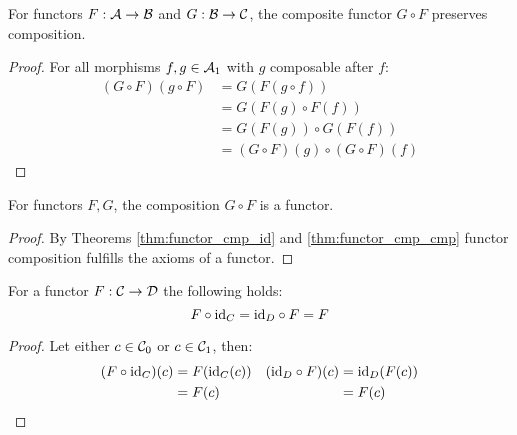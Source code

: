 \begin{theorem}
  For functors $F:\mathcal{A}\to \mathcal{B}$ and $G:\mathcal{B}\to \mathcal{C}$, the composite functor $G\circ F$
  preserves composition.

  \begin{proof}
    For all morphisms $f,g\in \mathcal{A}_1$ with $g$ composable after $f$:
    \[
      \begin{aligned}
        (G\circ F)(g\circ F)
        &= G(F(g\circ f))\\
        &= G(F(g)\circ F(f))\\
        &= G(F(g))\circ G(F(f))\\
        &= (G\circ F)(g)\circ(G\circ F)(f)
      \end{aligned}
    \]
  \end{proof}
\end{theorem}

\begin{theorem}
  For functors $F, G$, the composition $G\circ F$ is a functor.

  \begin{proof}
    By Theorems \ref{thm:functor_cmp_id} and \ref{thm:functor_cmp_cmp} functor
    composition fulfills the axioms of a functor.
  \end{proof}
\end{theorem}

\begin{theorem}
  For a functor $F:\mathcal{C}\to \mathcal{D}$ the following holds:
  \[F \circ \mathrm{id}_C = \mathrm{id}_D \circ F = F\]

  \begin{proof}
    Let either $c\in \mathcal{C}_0$ or $c\in \mathcal{C}_1$, then:
    \[
      \begin{aligned}
        (F \circ \mathrm{id}_C)(c)
          &= F(\mathrm{id}_C(c))\\
          &= F (c)
      \end{aligned}
      \quad
      \begin{aligned}
        (\mathrm{id}_D \circ F)(c)
          &= \mathrm{id}_D (F (c))\\
          &= F (c)
      \end{aligned}
    \]
  \end{proof}
\end{theorem}

